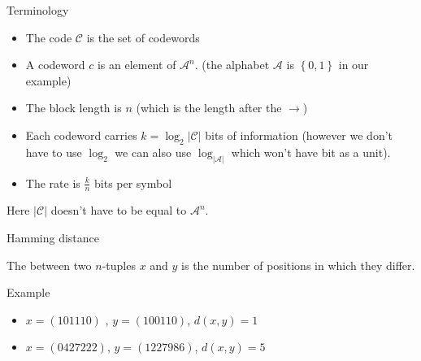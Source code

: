 \begin{parag}{Terminology}
    \begin{itemize}
        \item The code $\mathcal{C}$ is the set of codewords 
        \item A codeword $c$ is an element of $\mathcal{A}^n$. (the alphabet $\mathcal{A}$ is $\left\{0, 1\right\}$ in our example)
        \item The block length is $n$  (which is the length after the $\to$)
        \item Each codeword carries $k = \log_2\left|\mathcal{C}\right|$ bits of information (however we don't have to use $\log_2$ we can also use $\log_{\left|\mathcal{A}\right|}$ which won't have bit as a unit).
        \item The rate is $\frac{k}{n}$ bits per symbol
    \end{itemize}
    
   \begin{framedremark}
       Here $\left|\mathcal{C}\right|$ doesn't have to be equal to $\mathcal{A}^n$.
   \end{framedremark}
    
\end{parag}
\begin{parag}{Hamming distance}
    \begin{definition}
    The  between two $n$-tuples $x$ and $y$ is the number of positions in which they differ.
    \end{definition}
    \begin{subparag}{Example}
        \begin{itemize}
            \item $x = \left(101110\right)$ ,  $y = \left(100110\right)$, $d\left(x, y\right) = 1$
            \item $x = \left(0427222\right)$, $y = \left(1227986\right)$, $d\left(x, y\right) = 5$
        \end{itemize}
        
    \end{subparag}
    
\end{parag}
